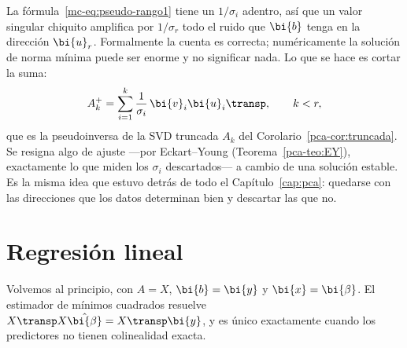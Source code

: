 \begin{remark}\label{mc-obs:truncar}
La fórmula~\eqref{mc-eq:pseudo-rango1} tiene un $1/\sigma_i$ adentro, así que
un valor singular chiquito amplifica por $1/\sigma_r$ todo el ruido que
$\bi{b}$ tenga en la dirección $\bi{u}_r$. Formalmente la cuenta es correcta;
numéricamente la solución de norma mínima puede ser enorme y no significar
nada. Lo que se hace es cortar la suma:
\[
A_k^{+}=\sum_{i=1}^{k}\frac1{\sigma_i}\,\bi{v}_i\bi{u}_i\transp ,
\qquad k<r ,
\]
que es la pseudoinversa de la SVD truncada $A_k$ del
Corolario~\ref{pca-cor:truncada}. Se resigna algo de ajuste
---por Eckart--Young (Teorema~\ref{pca-teo:EY}), exactamente lo que miden los
$\sigma_i$ descartados--- a cambio de una solución estable. Es la misma idea
que estuvo detrás de todo el Capítulo~\ref{cap:pca}: quedarse con las
direcciones que los datos determinan bien y descartar las que no.
\end{remark}

\section{Regresión lineal}\label{mc-sec:regresion}

Volvemos al principio, con $A=X$, $\bi{b}=\bi{y}$ y $\bi{x}=\bi{\beta}$. El
estimador de mínimos cuadrados resuelve
$X\transp X\hat{\bi{\beta}}=X\transp\bi{y}$, y es único exactamente cuando los
predictores no tienen colinealidad exacta.

